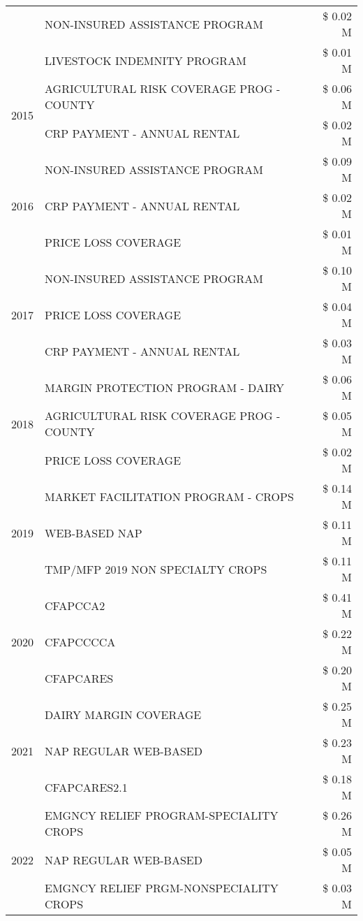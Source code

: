 \begin{tabular}{llr}
 & NON-INSURED ASSISTANCE PROGRAM & \$ 0.02 M \\
 & LIVESTOCK INDEMNITY PROGRAM & \$ 0.01 M \\
\cline{1-3}
\multirow[t]{2}{*}{2015} & AGRICULTURAL RISK COVERAGE PROG - COUNTY & \$ 0.06 M \\
 & CRP PAYMENT - ANNUAL RENTAL & \$ 0.02 M \\
\cline{1-3}
\multirow[t]{3}{*}{2016} & NON-INSURED ASSISTANCE PROGRAM & \$ 0.09 M \\
 & CRP PAYMENT - ANNUAL RENTAL & \$ 0.02 M \\
 & PRICE LOSS COVERAGE & \$ 0.01 M \\
\cline{1-3}
\multirow[t]{3}{*}{2017} & NON-INSURED ASSISTANCE PROGRAM & \$ 0.10 M \\
 & PRICE LOSS COVERAGE & \$ 0.04 M \\
 & CRP PAYMENT - ANNUAL RENTAL & \$ 0.03 M \\
\cline{1-3}
\multirow[t]{3}{*}{2018} & MARGIN PROTECTION PROGRAM - DAIRY & \$ 0.06 M \\
 & AGRICULTURAL RISK COVERAGE PROG - COUNTY & \$ 0.05 M \\
 & PRICE LOSS COVERAGE & \$ 0.02 M \\
\cline{1-3}
\multirow[t]{3}{*}{2019} & MARKET FACILITATION PROGRAM - CROPS & \$ 0.14 M \\
 & WEB-BASED NAP & \$ 0.11 M \\
 & TMP/MFP 2019 NON SPECIALTY CROPS & \$ 0.11 M \\
\cline{1-3}
\multirow[t]{3}{*}{2020} & CFAPCCA2 & \$ 0.41 M \\
 & CFAPCCCCA & \$ 0.22 M \\
 & CFAPCARES & \$ 0.20 M \\
\cline{1-3}
\multirow[t]{3}{*}{2021} & DAIRY MARGIN COVERAGE & \$ 0.25 M \\
 & NAP REGULAR WEB-BASED & \$ 0.23 M \\
 & CFAPCARES2.1 & \$ 0.18 M \\
\cline{1-3}
\multirow[t]{3}{*}{2022} & EMGNCY RELIEF PROGRAM-SPECIALITY CROPS & \$ 0.26 M \\
 & NAP REGULAR WEB-BASED & \$ 0.05 M \\
 & EMGNCY RELIEF PRGM-NONSPECIALITY CROPS & \$ 0.03 M \\
\cline{1-3}
\bottomrule
\end{tabular}
